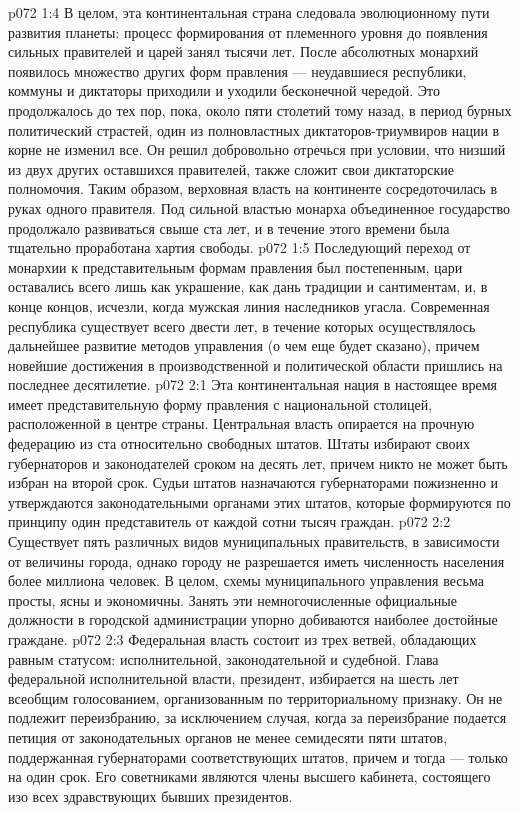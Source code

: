 \vs p072 1:4 \pc В целом, эта континентальная страна следовала эволюционному пути развития планеты: процесс формирования от племенного уровня до появления сильных правителей и царей занял тысячи лет. После абсолютных монархий появилось множество других форм правления --- неудавшиеся республики, коммуны и диктаторы приходили и уходили бесконечной чередой. Это продолжалось до тех пор, пока, около пяти столетий тому назад, в период бурных политический страстей, один из полновластных диктаторов\hyp{}триумвиров нации в корне не изменил все. Он решил добровольно отречься при условии, что низший из двух других оставшихся правителей, также сложит свои диктаторские полномочия. Таким образом, верховная власть на континенте сосредоточилась в руках одного правителя. Под сильной властью монарха объединенное государство продолжало развиваться свыше ста лет, и в течение этого времени была тщательно проработана хартия свободы.
\vs p072 1:5 Последующий переход от монархии к представительным формам правления был постепенным, цари оставались всего лишь как украшение, как дань традиции и сантиментам, и, в конце концов, исчезли, когда мужская линия наследников угасла. Современная республика существует всего двести лет, в течение которых осуществлялось дальнейшее развитие методов управления (о чем еще будет сказано), причем новейшие достижения в производственной и политической области пришлись на последнее десятилетие.
\vs p072 2:1 Эта континентальная нация в настоящее время имеет представительную форму правления с национальной столицей, расположенной в центре страны. Центральная власть опирается на прочную федерацию из ста относительно свободных штатов. Штаты избирают своих губернаторов и законодателей сроком на десять лет, причем никто не может быть избран на второй срок. Судьи штатов назначаются губернаторами пожизненно и утверждаются законодательными органами этих штатов, которые формируются по принципу один представитель от каждой сотни тысяч граждан.
\vs p072 2:2 Существует пять различных видов муниципальных правительств, в зависимости от величины города, однако городу не разрешается иметь численность населения более миллиона человек. В целом, схемы муниципального управления весьма просты, ясны и экономичны. Занять эти немногочисленные официальные должности в городской администрации упорно добиваются наиболее достойные граждане.
\vs p072 2:3 Федеральная власть состоит из трех ветвей, обладающих равным статусом: исполнительной, законодательной и судебной. Глава федеральной исполнительной власти, президент, избирается на шесть лет всеобщим голосованием, организованным по территориальному признаку. Он не подлежит переизбранию, за исключением случая, когда за переизбрание подается петиция от законодательных органов не менее семидесяти пяти штатов, поддержанная губернаторами соответствующих штатов, причем и тогда --- только на один срок. Его советниками являются члены высшего кабинета, состоящего изо всех здравствующих бывших президентов.
